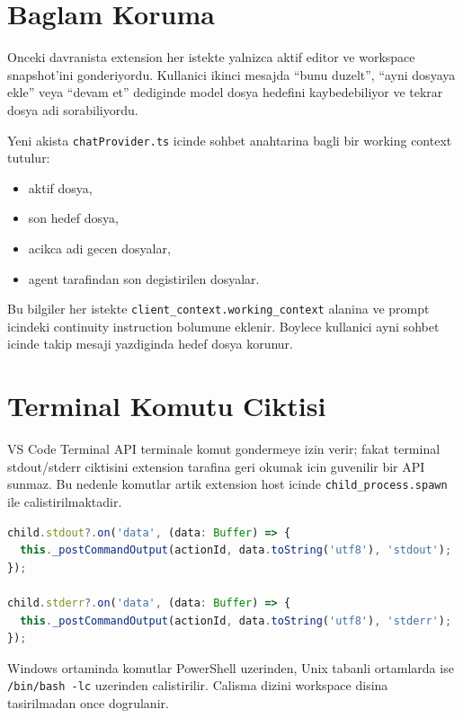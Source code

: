 \documentclass[12pt,a4paper]{article}
\begin{document}
\section{Baglam Koruma}

Onceki davranista extension her istekte yalnizca aktif editor ve workspace snapshot'ini gonderiyordu. Kullanici ikinci mesajda ``bunu duzelt'', ``ayni dosyaya ekle'' veya ``devam et'' dediginde model dosya hedefini kaybedebiliyor ve tekrar dosya adi sorabiliyordu.

Yeni akista \texttt{chatProvider.ts} icinde sohbet anahtarina bagli bir working context tutulur:

\begin{itemize}[leftmargin=2em]
  \item aktif dosya,
  \item son hedef dosya,
  \item acikca adi gecen dosyalar,
  \item agent tarafindan son degistirilen dosyalar.
\end{itemize}

Bu bilgiler her istekte \texttt{client\_context.working\_context} alanina ve prompt icindeki continuity instruction bolumune eklenir. Boylece kullanici ayni sohbet icinde takip mesaji yazdiginda hedef dosya korunur.

\section{Terminal Komutu Ciktisi}

VS Code Terminal API terminale komut gondermeye izin verir; fakat terminal stdout/stderr ciktisini extension tarafina geri okumak icin guvenilir bir API sunmaz. Bu nedenle komutlar artik extension host icinde \texttt{child\_process.spawn} ile calistirilmaktadir.

\begin{lstlisting}[language=TypeScript, caption={Komut ciktisinin webview'e aktarilmasi}]
child.stdout?.on('data', (data: Buffer) => {
  this._postCommandOutput(actionId, data.toString('utf8'), 'stdout');
});

child.stderr?.on('data', (data: Buffer) => {
  this._postCommandOutput(actionId, data.toString('utf8'), 'stderr');
});
\end{lstlisting}

Windows ortaminda komutlar PowerShell uzerinden, Unix tabanli ortamlarda ise \texttt{/bin/bash -lc} uzerinden calistirilir. Calisma dizini workspace disina tasirilmadan once dogrulanir.
\end{document}
